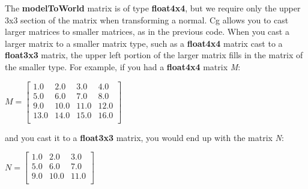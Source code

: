 \documentclass[../main.tex]{subfiles}
\begin{document}
The \textbf{modelToWorld} matrix is of type \textbf{float4x4}, but we require only the upper 3x3 section of the matrix when transforming a normal. Cg allows you to cast larger matrices to smaller matrices, as in the previous code. When you cast a larger matrix to a smaller matrix type, such as a \textbf{float4x4} matrix cast to a \textbf{float3x3} matrix, the upper left portion of the larger matrix fills in the matrix of the smaller type. For example, if you had a \textbf{float4x4} matrix \textit{M}:

$
M = \begin{bmatrix}
1.0 & 2.0 & 3.0 & 4.0 \\
5.0 & 6.0 & 7.0 & 8.0 \\
9.0 & 10.0 & 11.0 & 12.0 \\
13.0 & 14.0 & 15.0 & 16.0 \\
\end{bmatrix}
$

and you cast it to a \textbf{float3x3} matrix, you would end up with the matrix \textit{N}:

$
N = \begin{bmatrix}
1.0 & 2.0 & 3.0 \\
5.0 & 6.0 & 7.0 \\
9.0 & 10.0 & 11.0 \\
\end{bmatrix}
$
\end{document}
